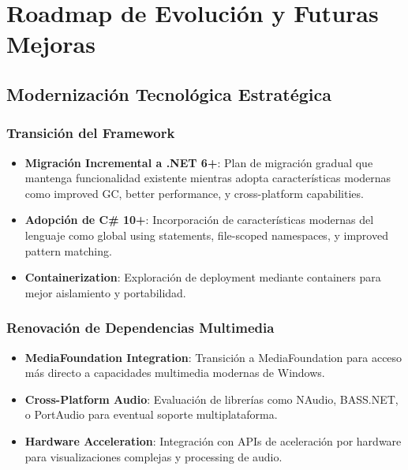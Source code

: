 \documentclass[a4paper]{article}
\begin{document}
\section{Roadmap de Evolución y Futuras Mejoras}

\subsection{Modernización Tecnológica Estratégica}

\subsubsection{Transición del Framework}

\begin{itemize}
\item \textbf{Migración Incremental a .NET 6+}: Plan de migración gradual que mantenga funcionalidad existente mientras adopta características modernas como improved GC, better performance, y cross-platform capabilities.

\item \textbf{Adopción de C\# 10+}: Incorporación de características modernas del lenguaje como global using statements, file-scoped namespaces, y improved pattern matching.

\item \textbf{Containerization}: Exploración de deployment mediante containers para mejor aislamiento y portabilidad.
\end{itemize}

\subsubsection{Renovación de Dependencias Multimedia}

\begin{itemize}
\item \textbf{MediaFoundation Integration}: Transición a MediaFoundation para acceso más directo a capacidades multimedia modernas de Windows.

\item \textbf{Cross-Platform Audio}: Evaluación de librerías como NAudio, BASS.NET, o PortAudio para eventual soporte multiplataforma.

\item \textbf{Hardware Acceleration}: Integración con APIs de aceleración por hardware para visualizaciones complejas y processing de audio.
\end{itemize}
\end{document}
